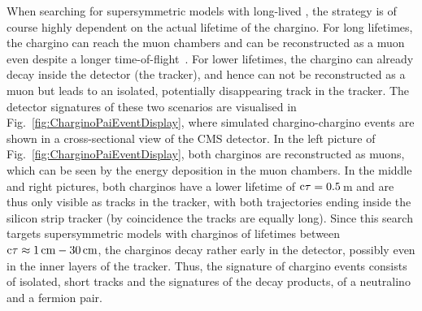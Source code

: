 When searching for supersymmetric models with long-lived \chipm, the strategy is of course highly dependent on the actual lifetime of the chargino. 
For long lifetimes, the chargino can reach the muon chambers and can be reconstructed as a muon even despite a longer time-of-flight~\cite{bib:CMS:HSCP_7TeV}. 
For lower lifetimes, the chargino can already decay inside the detector (\eg the tracker), and hence can not be reconstructed as a muon but leads to an isolated, potentially disappearing track in the tracker. 
The detector signatures of these two scenarios are visualised in Fig.~\ref{fig:CharginoPaiEventDisplay}, where simulated chargino-chargino events are shown in a cross-sectional view of the CMS detector.
In the left picture of Fig.~\ref{fig:CharginoPaiEventDisplay}, both charginos are reconstructed as muons, which can be seen by the energy deposition in the muon chambers.
In the middle and right pictures, both charginos have a lower lifetime of $\text{c}\tau=0.5\,$m and are thus only visible as tracks in the tracker, with both trajectories ending inside the silicon strip tracker (by coincidence the tracks are equally long).
Since this search targets supersymmetric models with charginos of lifetimes between $\text{c}\tau \approx 1\,\text{cm} - 30\,\text{cm}$, the charginos decay rather early in the detector, possibly even in the inner layers of the tracker.
Thus, the signature of chargino events consists of isolated, short tracks and the signatures of the decay products, \ie of a neutralino and a fermion pair. 
